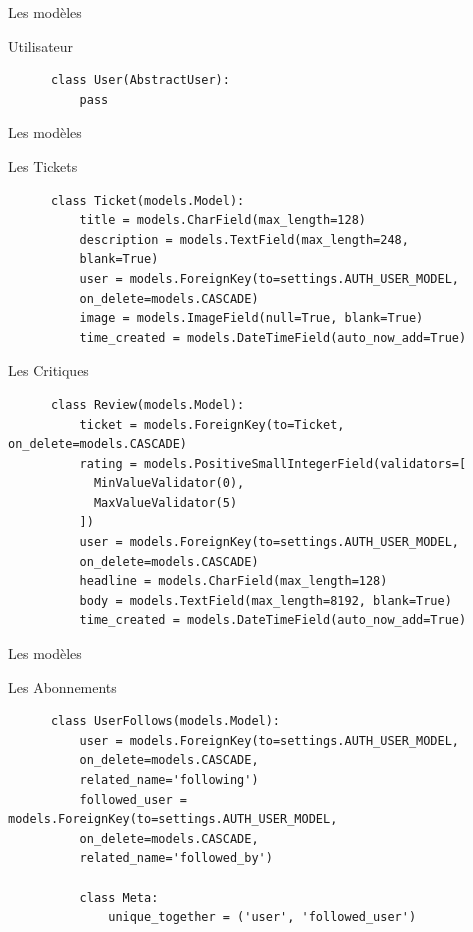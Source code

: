 \begin{frame}[fragile]{Les modèles}
  \begin{block}{Utilisateur}
    \begin{lstlisting}
      class User(AbstractUser):
          pass
    \end{lstlisting}    
  \end{block}
\end{frame}

\begin{frame}[fragile]{Les modèles}
  \begin{block}{Les Tickets}
    \tiny
    \begin{lstlisting}
      class Ticket(models.Model):
          title = models.CharField(max_length=128)
          description = models.TextField(max_length=248,
          blank=True)
          user = models.ForeignKey(to=settings.AUTH_USER_MODEL,
          on_delete=models.CASCADE)
          image = models.ImageField(null=True, blank=True)
          time_created = models.DateTimeField(auto_now_add=True)
    \end{lstlisting}    
  \end{block}

  \begin{block}{Les Critiques}
    \tiny
    \begin{lstlisting}
      class Review(models.Model):
          ticket = models.ForeignKey(to=Ticket, on_delete=models.CASCADE)
          rating = models.PositiveSmallIntegerField(validators=[
            MinValueValidator(0),
            MaxValueValidator(5)
          ])
          user = models.ForeignKey(to=settings.AUTH_USER_MODEL,
          on_delete=models.CASCADE)
          headline = models.CharField(max_length=128)
          body = models.TextField(max_length=8192, blank=True)
          time_created = models.DateTimeField(auto_now_add=True)
    \end{lstlisting}
  \end{block}
\end{frame}

\begin{frame}[fragile]{Les modèles}
  \begin{block}{Les Abonnements}
    \tiny
    \begin{lstlisting}
      class UserFollows(models.Model):
          user = models.ForeignKey(to=settings.AUTH_USER_MODEL,
          on_delete=models.CASCADE,
          related_name='following')
          followed_user = models.ForeignKey(to=settings.AUTH_USER_MODEL,
          on_delete=models.CASCADE,
          related_name='followed_by')
          
          class Meta:
              unique_together = ('user', 'followed_user')
    \end{lstlisting}    
  \end{block}
\end{frame}

